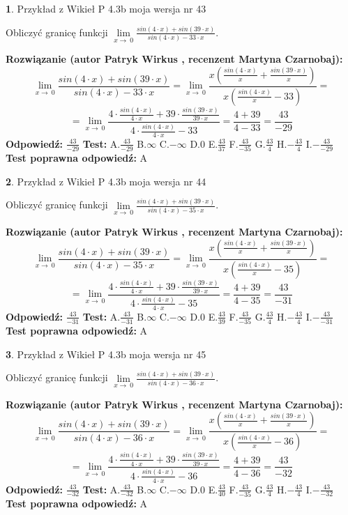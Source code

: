 \documentclass[12pt, a4paper]{article}
\theoremstyle{definition} %
\newtheorem{zad}{}
\newcommand{\zadStart}[1]{\begin{zad}#1\newline}
\newcommand{\zadStop}{\end{zad}}
\newcommand{\rozwStart}[2]{\noindent \textbf{Rozwiązanie (autor #1 , recenzent #2): }\newline}
\newcommand{\rozwStop}{\newline}
\newcommand{\odpStart}{\noindent \textbf{Odpowiedź:}\newline}
\newcommand{\odpStop}{\newline}
\newcommand{\testStart}{\noindent \textbf{Test:}\newline}
\newcommand{\testStop}{\newline}
\newcommand{\kluczStart}{\noindent \textbf{Test poprawna odpowiedź:}\newline}
\newcommand{\kluczStop}{\newline}
\begin{document}
\zadStart{Przykład z Wikieł P 4.3b moja wersja nr 43}


Obliczyć granicę funkcji $\lim\limits_{x\to\ 0}\frac{sin(4 \cdot x)+sin(39 \cdot x)}{sin(4 \cdot x)-33 \cdot x}$.
\zadStop
\rozwStart{Patryk Wirkus}{Martyna Czarnobaj}
$$\lim\limits_{x\to\ 0}\frac{sin(4 \cdot x)+sin(39 \cdot x)}{sin(4 \cdot x)-33 \cdot x}=\lim\limits_{x\to\ 0}\frac{x(\frac{sin(4 \cdot x)}{x}+\frac{sin(39 \cdot x)}{x})}{x(\frac{sin(4 \cdot x)}{x}-33)}=$$
$$=\lim\limits_{x\to\ 0}\frac{4 \cdot \frac{sin(4 \cdot x)}{4 \cdot x}+39 \cdot \frac{sin(39 \cdot x)}{39 \cdot x}}{4 \cdot \frac{sin(4 \cdot x)}{4 \cdot x}-33}=\frac{4+39}{4-33} = \frac{43}{-29}$$
\rozwStop
\odpStart
$\frac{43}{-29}$
\odpStop
\testStart
A.$\frac{43}{-29}$
B.$\infty$
C.$-\infty$
D.$0$
E.$\frac{43}{37}$
F.$\frac{43}{-35}$
G.$\frac{43}{4}$
H.$-\frac{43}{4}$
I.$-\frac{43}{-29}$
\testStop
\kluczStart
A
\kluczStop



\zadStart{Przykład z Wikieł P 4.3b moja wersja nr 44}


Obliczyć granicę funkcji $\lim\limits_{x\to\ 0}\frac{sin(4 \cdot x)+sin(39 \cdot x)}{sin(4 \cdot x)-35 \cdot x}$.
\zadStop
\rozwStart{Patryk Wirkus}{Martyna Czarnobaj}
$$\lim\limits_{x\to\ 0}\frac{sin(4 \cdot x)+sin(39 \cdot x)}{sin(4 \cdot x)-35 \cdot x}=\lim\limits_{x\to\ 0}\frac{x(\frac{sin(4 \cdot x)}{x}+\frac{sin(39 \cdot x)}{x})}{x(\frac{sin(4 \cdot x)}{x}-35)}=$$
$$=\lim\limits_{x\to\ 0}\frac{4 \cdot \frac{sin(4 \cdot x)}{4 \cdot x}+39 \cdot \frac{sin(39 \cdot x)}{39 \cdot x}}{4 \cdot \frac{sin(4 \cdot x)}{4 \cdot x}-35}=\frac{4+39}{4-35} = \frac{43}{-31}$$
\rozwStop
\odpStart
$\frac{43}{-31}$
\odpStop
\testStart
A.$\frac{43}{-31}$
B.$\infty$
C.$-\infty$
D.$0$
E.$\frac{43}{39}$
F.$\frac{43}{-35}$
G.$\frac{43}{4}$
H.$-\frac{43}{4}$
I.$-\frac{43}{-31}$
\testStop
\kluczStart
A
\kluczStop



\zadStart{Przykład z Wikieł P 4.3b moja wersja nr 45}


Obliczyć granicę funkcji $\lim\limits_{x\to\ 0}\frac{sin(4 \cdot x)+sin(39 \cdot x)}{sin(4 \cdot x)-36 \cdot x}$.
\zadStop
\rozwStart{Patryk Wirkus}{Martyna Czarnobaj}
$$\lim\limits_{x\to\ 0}\frac{sin(4 \cdot x)+sin(39 \cdot x)}{sin(4 \cdot x)-36 \cdot x}=\lim\limits_{x\to\ 0}\frac{x(\frac{sin(4 \cdot x)}{x}+\frac{sin(39 \cdot x)}{x})}{x(\frac{sin(4 \cdot x)}{x}-36)}=$$
$$=\lim\limits_{x\to\ 0}\frac{4 \cdot \frac{sin(4 \cdot x)}{4 \cdot x}+39 \cdot \frac{sin(39 \cdot x)}{39 \cdot x}}{4 \cdot \frac{sin(4 \cdot x)}{4 \cdot x}-36}=\frac{4+39}{4-36} = \frac{43}{-32}$$
\rozwStop
\odpStart
$\frac{43}{-32}$
\odpStop
\testStart
A.$\frac{43}{-32}$
B.$\infty$
C.$-\infty$
D.$0$
E.$\frac{43}{40}$
F.$\frac{43}{-35}$
G.$\frac{43}{4}$
H.$-\frac{43}{4}$
I.$-\frac{43}{-32}$
\testStop
\kluczStart
A
\kluczStop
\end{document}
